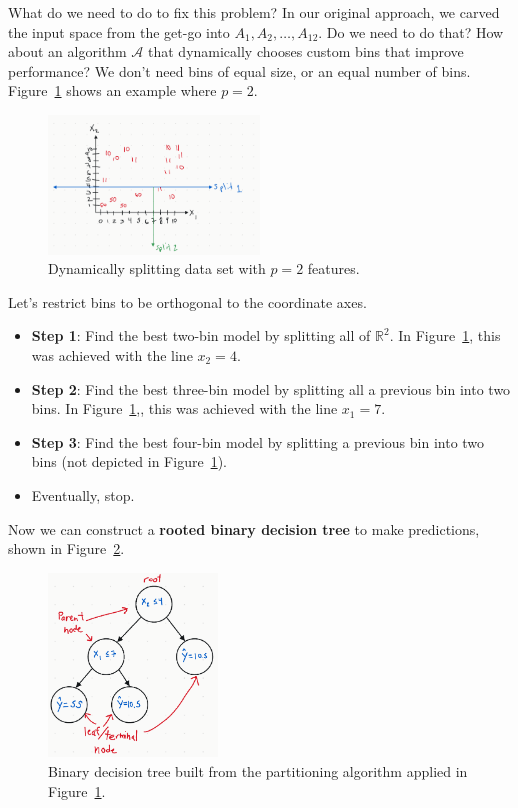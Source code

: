 \documentclass[12pt, a4paper]{article}
\theoremstyle{definition}
\begin{document}
	What do we need to do to fix this problem? In our original approach, we carved
	the input space from the get-go into $A_1,A_2,\ldots,A_{12}$. Do we need to do that?
	How about an algorithm $\mathcal{A}$ that dynamically chooses custom bins that
	improve performance? We don't need bins of equal size, or an equal number of bins.
	Figure~\ref{fig:dynamic-split-interval-data} shows an example where $p = 2$.
	\begin{figure}
		\centering
		\includegraphics[width=0.5\textwidth]{dynamic-split-interval-data}
		\caption{Dynamically splitting data set with $p = 2$ features.}
		\label{fig:dynamic-split-interval-data}
	\end{figure}
	Let's restrict bins to be orthogonal to the coordinate axes.
	\begin{itemize}
		\item \textbf{Step 1}: Find the best two-bin model by splitting
		all of $\mathbb{R}^2$. In Figure~\ref{fig:dynamic-split-interval-data},
		this was achieved with the line $x_2 = 4$.
		\item \textbf{Step 2}: Find the best three-bin model by
		splitting all a previous bin into two bins. In
		Figure~\ref{fig:dynamic-split-interval-data},, this was achieved
		with the line $x_1 = 7$.
		\item \textbf{Step 3}: Find the best four-bin model by splitting a previous
		bin into two bins (not depicted in
		Figure~\ref{fig:dynamic-split-interval-data}).
		\item Eventually, stop.
	\end{itemize}
	Now we can construct a \textbf{rooted binary decision tree} to make predictions, shown in
	Figure~\ref{fig:regression-tree}.
	\begin{figure}
		\centering
		\includegraphics[width=0.4\textwidth]{regression-tree}
		\caption{Binary decision tree built from the partitioning algorithm
		applied in Figure~\ref{fig:dynamic-split-interval-data}.}
		\label{fig:regression-tree}
	\end{figure}
\end{document}
